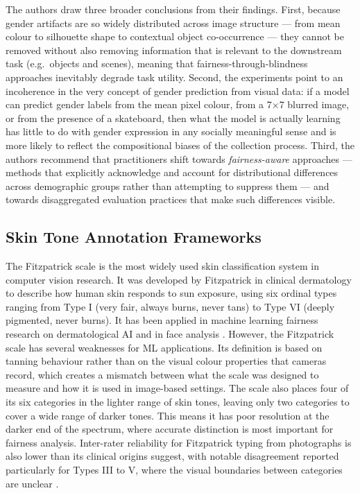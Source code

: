 The authors draw three broader conclusions from their findings.  First, because gender
artifacts are so widely distributed across image structure --- from mean colour to silhouette
shape to contextual object co-occurrence --- they cannot be removed without also removing
information that is relevant to the downstream task (e.g.\ objects and scenes), meaning that
fairness-through-blindness approaches inevitably degrade task utility.  Second, the
experiments point to an incoherence in the very concept of gender prediction from visual
data: if a model can predict gender labels from the mean pixel colour, from a 7$\times$7
blurred image, or from the presence of a skateboard, then what the model is actually
learning has little to do with gender expression in any socially meaningful sense and is more
likely to reflect the compositional biases of the collection process.  Third, the authors
recommend that practitioners shift towards \emph{fairness-aware} approaches --- methods that
explicitly acknowledge and account for distributional differences across demographic groups
rather than attempting to suppress them --- and towards disaggregated evaluation practices
that make such differences visible.
















\subsection{Skin Tone Annotation Frameworks}
The Fitzpatrick scale is the most widely used skin classification system in computer vision research. It was developed by Fitzpatrick \cite{Fitzpatrick_1988_SkinTypes} in clinical dermatology to describe how human skin responds to sun exposure, using six ordinal types ranging from Type I (very fair, always burns, never tans) to Type VI (deeply pigmented, never burns). It has been applied in machine learning fairness research on dermatological AI \cite{Groh_2021_Fitzpatrick17k} and in face analysis \cite{Buolamwini_2018_GenderShades}. However, the Fitzpatrick scale has several weaknesses for ML applications. Its definition is based on tanning behaviour rather than on the visual colour properties that cameras record, which creates a mismatch between what the scale was designed to measure and how it is used in image-based settings. The scale also places four of its six categories in the lighter range of skin tones, leaving only two categories to cover a wide range of darker tones. This means it has poor resolution at the darker end of the spectrum, where accurate distinction is most important for fairness analysis. Inter-rater reliability for Fitzpatrick typing from photographs is also lower than its clinical origins suggest, with notable disagreement reported particularly for Types III to V, where the visual boundaries between categories are unclear \cite{Groh_2021_Fitzpatrick17k}.

